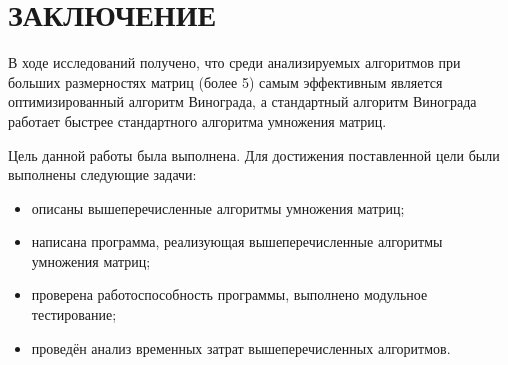 \chapter*{\hfill{\centering  ЗАКЛЮЧЕНИЕ}\hfill}

В ходе исследований получено, что среди анализируемых алгоритмов при больших размерностях матриц (более 5) самым эффективным является оптимизированный алгоритм Винограда, а стандартный алгоритм Винограда работает быстрее стандартного алгоритма умножения матриц.

Цель данной работы была выполнена. 
Для достижения поставленной цели были выполнены следующие задачи:
\begin{itemize}[label=---]
	\item описаны вышеперечисленные алгоритмы умножения матриц;
	\item написана программа, реализующая вышеперечисленные алгоритмы умножения матриц;
	\item проверена работоспособность программы, выполнено модульное тестирование;
	\item проведён анализ временных затрат вышеперечисленных алгоритмов.
\end{itemize}

